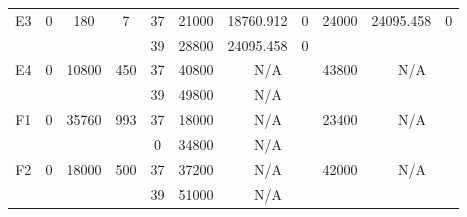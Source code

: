 \begin{sidewaystable}
\begin{tabular}{c||c|c|c||c|c|c|c||c|c|c}
         &
        
      \\
      \hline
      \multirow{2}{*}{E3} &
      \multirow{2}{*}{0} &
      \multirow{2}{*}{180} &
      \multirow{2}{*}{7} &
      37 &
      21000 &
        18760.912 &
        0 &
      \multirow{2}{*}{24000} &
        \multirow{2}{*}{24095.458} &
        \multirow{2}{*}{0}
      \\
      \cline{5-8}
       &
       &
       &
       &
      39 &
      28800 &
        24095.458 &
        0 &
      
         &
        
      \\
      \hline
      \multirow{2}{*}{E4} &
      \multirow{2}{*}{0} &
      \multirow{2}{*}{10800} &
      \multirow{2}{*}{450} &
      37 &
      40800 &
        \multicolumn{2}{|c||}{N/A} &
      \multirow{2}{*}{43800} &
        \multicolumn{2}{c}{\multirow{2}{*}{N/A}}
      \\
      \cline{5-8}
       &
       &
       &
       &
      39 &
      49800 &
        \multicolumn{2}{|c||}{N/A} &
      
        
      \\
      \hline
      \multirow{2}{*}{F1} &
      \multirow{2}{*}{0} &
      \multirow{2}{*}{35760} &
      \multirow{2}{*}{993} &
      37 &
      18000 &
        \multicolumn{2}{|c||}{N/A} &
      \multirow{2}{*}{23400} &
        \multicolumn{2}{c}{\multirow{2}{*}{N/A}}
      \\
      \cline{5-8}
       &
       &
       &
       &
      0 &
      34800 &
        \multicolumn{2}{|c||}{N/A} &
      
        
      \\
      \hline
      \multirow{2}{*}{F2} &
      \multirow{2}{*}{0} &
      \multirow{2}{*}{18000} &
      \multirow{2}{*}{500} &
      37 &
      37200 &
        \multicolumn{2}{|c||}{N/A} &
      \multirow{2}{*}{42000} &
        \multicolumn{2}{c}{\multirow{2}{*}{N/A}}
      \\
      \cline{5-8}
       &
       &
       &
       &
      39 &
      51000 &
        \multicolumn{2}{|c||}{N/A} &
      
        
      \\
\end{tabular}
\label{table:RASDATASET3} 
\end{sidewaystable}